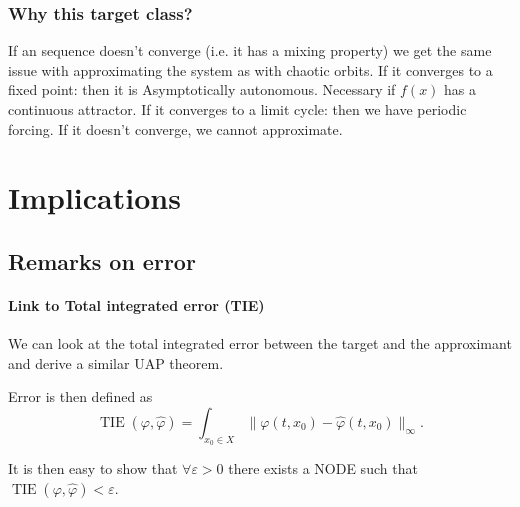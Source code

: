 \documentclass{article}
\theoremstyle{definition} \newtheorem{definition}{Definition}
\theoremstyle{remark} \newtheorem{remark}{Remark}
\newcounter{ct}
\begin{document}
\subsubsection{Why this target class?}
If an sequence doesn't converge (i.e. it has a mixing property) we get the same issue with approximating the system as with chaotic orbits.
If it converges to a fixed point: then it is Asymptotically autonomous. Necessary if $f(x)$ has a continuous attractor.
If it converges to a limit cycle: then we have periodic forcing. 
If it doesn't converge, we cannot approximate.  %






\newpage
\section{Implications}

\subsection{Remarks on error}\label{sec:error_remarks}
\paragraph{Link to Total integrated error (TIE)}
We can look at the total integrated error between the target and the approximant and derive a similar UAP theorem.

Error is then defined as 
\begin{equation}
\operatorname{TIE}(\varphi, \hat{\varphi}) = \int_{x_0\in X}\|\varphi(t,x_0) - \hat{\varphi}(t, x_0)\|_\infty.
\end{equation}

It is then easy to show that $\forall\varepsilon>0$ there exists a NODE such that $\operatorname{TIE}(\varphi, \hat{\varphi})<\varepsilon$.
\end{document}
